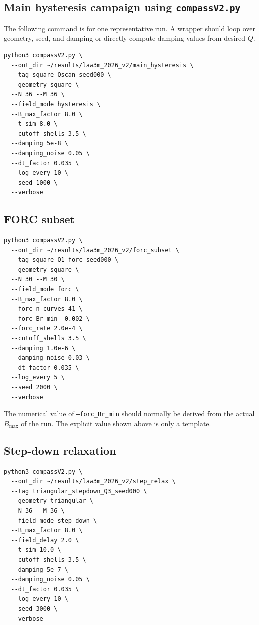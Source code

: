\documentclass[11pt,a4paper]{article}
\newcommand{\code}[1]{\texttt{#1}}
\begin{document}
\subsection{Main hysteresis campaign using \code{compassV2.py}}

The following command is for one representative run. A wrapper should loop over geometry, seed, and damping or directly compute damping values from desired $Q$.

\begin{lstlisting}[style=bashstyle]
python3 compassV2.py \
  --out_dir ~/results/law3m_2026_v2/main_hysteresis \
  --tag square_Qscan_seed000 \
  --geometry square \
  --N 36 --M 36 \
  --field_mode hysteresis \
  --B_max_factor 8.0 \
  --t_sim 8.0 \
  --cutoff_shells 3.5 \
  --damping 5e-8 \
  --damping_noise 0.05 \
  --dt_factor 0.035 \
  --log_every 10 \
  --seed 1000 \
  --verbose
\end{lstlisting}

\subsection{FORC subset}

\begin{lstlisting}[style=bashstyle]
python3 compassV2.py \
  --out_dir ~/results/law3m_2026_v2/forc_subset \
  --tag square_Q1_forc_seed000 \
  --geometry square \
  --N 30 --M 30 \
  --field_mode forc \
  --B_max_factor 8.0 \
  --forc_n_curves 41 \
  --forc_Br_min -0.002 \
  --forc_rate 2.0e-4 \
  --cutoff_shells 3.5 \
  --damping 1.0e-6 \
  --damping_noise 0.03 \
  --dt_factor 0.035 \
  --log_every 5 \
  --seed 2000 \
  --verbose
\end{lstlisting}

The numerical value of \code{--forc\_Br\_min} should normally be derived from the actual $B_{\max}$ of the run. The explicit value shown above is only a template.

\subsection{Step-down relaxation}

\begin{lstlisting}[style=bashstyle]
python3 compassV2.py \
  --out_dir ~/results/law3m_2026_v2/step_relax \
  --tag triangular_stepdown_Q3_seed000 \
  --geometry triangular \
  --N 36 --M 36 \
  --field_mode step_down \
  --B_max_factor 8.0 \
  --field_delay 2.0 \
  --t_sim 10.0 \
  --cutoff_shells 3.5 \
  --damping 5e-7 \
  --damping_noise 0.05 \
  --dt_factor 0.035 \
  --log_every 10 \
  --seed 3000 \
  --verbose
\end{lstlisting}
\end{document}
